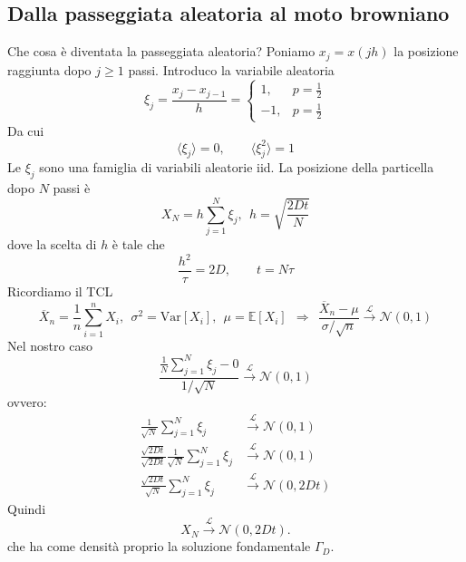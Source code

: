 \documentclass[10pt,a4paper,twoside,openright]{book}
\begin{document}
\subsection{Dalla passeggiata aleatoria al moto browniano}

Che cosa è diventata la passeggiata aleatoria? Poniamo $x_{j} =x(jh)$ la posizione raggiunta dopo $j\geq 1$ passi. Introduco la variabile aleatoria
\begin{equation*}
\xi _{j} =\frac{x_{j} -x_{j-1}}{h} =
\begin{cases}
1, & p=\frac{1}{2}\\
-1, & p=\frac{1}{2}
\end{cases}
\end{equation*}
Da cui
\begin{equation*}
\langle \xi _{j} \rangle =0,\qquad \langle \xi ^{2}_{j} \rangle =1
\end{equation*}
Le $\displaystyle \xi _{j}$ sono una famiglia di variabili aleatorie iid. La posizione della particella dopo $N$ passi è 
\begin{equation*}
X_{N} =h\sum ^{N}_{j=1} \xi _{j},\ \ h=\sqrt{\frac{2Dt}{N}}
\end{equation*}
dove la scelta di $h$ è tale che 
\begin{equation*}
\frac{h^{2}}{\tau } =2D,\qquad t=N\tau
\end{equation*}
Ricordiamo il TCL
\begin{equation*}
\overline{X}_{n} =\frac{1}{n}\sum _{i=1}^{n} X_{i} ,\ \ \sigma ^{2} =\mathrm{Var}[ X_{i}] ,\ \ \mu =\mathbb{E}[ X_{i}] \ \ \Rightarrow \ \ \frac{\overline{X}_{n} -\mu }{\sigma /\sqrt{n}}\xrightarrow{\mathcal{L}}\mathcal{N}(0,1)
\end{equation*}
Nel nostro caso
\begin{equation*}
\frac{\frac{1}{N}\sum _{j=1}^{N} \xi _{j} -0}{1/\sqrt{N}}\xrightarrow{\mathcal{L}}\mathcal{N}(0,1)
\end{equation*}
ovvero:
\begin{align*}
\frac{1}{\sqrt{N}}\sum _{j=1}^{N} \xi _{j} & \xrightarrow{\mathcal{L}}\mathcal{N}(0,1)\\
\frac{\sqrt{2Dt}}{\sqrt{2Dt}}\frac{1}{\sqrt{N}}\sum _{j=1}^{N} \xi _{j} & \xrightarrow{\mathcal{L}}\mathcal{N}(0,1)\\
\frac{\sqrt{2Dt}}{\sqrt{N}}\sum _{j=1}^{N} \xi _{j} & \xrightarrow{\mathcal{L}}\mathcal{N}(0,2Dt)
\end{align*}
Quindi
\begin{equation}
X_{N}\xrightarrow{\mathcal{L}}\mathcal{N}(0,2Dt) .
\end{equation}
che ha come densità proprio la soluzione fondamentale $\displaystyle \Gamma _{D}$.
\end{document}
